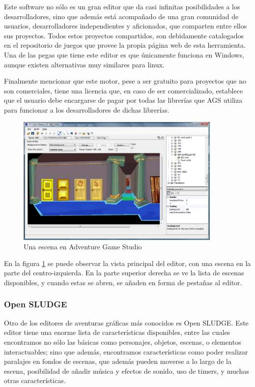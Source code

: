 Este software no sólo es un gran editor que da casi infinitas posibilidades a los desarrolladores, sino que además está acompañado de una gran comunidad de usuarios, desarrolladores independientes y aficionados, que comparten entre ellos sus proyectos. Todos estos proyectos compartidos, son debidamente catalogados en el repositorio de juegos que provee la propia página web de esta herramienta. Una de las pegas que tiene este editor es que únicamente funciona en Windows, aunque existen alternativas muy similares para linux.

Finalmente mencionar que este motor, pese a ser gratuito para proyectos que no son comerciales, tiene una licencia que, en caso de ser comercializado, establece que el usuario debe encargarse de pagar por todas las librerías que AGS utiliza para funcionar a los desarrolladores de dichas librerías.

\begin{figure}[htb]
    \centerline{\includegraphics[height=2.5in]{figures/ags.png}}
    \caption[Adventure Game Studio]{Una escena en Adventure Game Studio}
    \label{agsfigure}
\end{figure}

En la figura \ref{agsfigure} se puede observar la vista principal del editor, con una escena en la parte del centro-izquierda. En la parte superior derecha se ve la lista de escenas disponibles, y cuando estas se abren, se añaden en forma de pestañas al editor.

\subsubsection{Open SLUDGE}
\label{opensludge}

Otro de los editores de aventuras gráficas más conocidos es Open SLUDGE. Este editor tiene una enorme lista de características disponibles, entre las cuales encontramos no sólo las básicas como personajes, objetos, escenas, o elementos interactuables; sino que además, encontramos características como poder realizar paralajes en fondos de escenas, que además pueden moverse a lo largo de la escena, posibilidad de añadir música y efectos de sonido, uso de timers, y muchas otras características.

